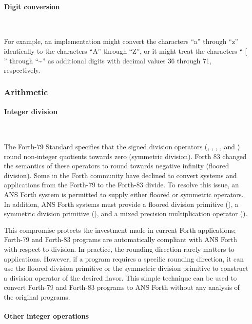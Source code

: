 \setcounter{paragraph}{1}
\paragraph{Digit conversion} ~ %

For example, an implementation might convert the characters ``a''
through ``z'' identically to the characters ``A'' through ``Z'', or
it might treat the characters `` [ '' through ``\~{}'' as additional
digits with decimal values 36 through 71, respectively.


\subsubsection{Arithmetic} %

\paragraph{Integer division} ~ %

The Forth-79 Standard specifies that the signed division operators
(\word{/}, , , , and \word{*/})
round non-integer quotients towards zero (symmetric division).
Forth 83 changed the semantics of these operators to round towards
negative infinity (floored division). Some in the Forth community
have declined to convert systems and applications from the Forth-79
to the Forth-83 divide. To resolve this issue, an ANS Forth system
is permitted to supply either floored or symmetric operators. In
addition, ANS Forth systems must provide a floored division primitive
(), a symmetric division primitive (), and
a mixed precision multiplication operator ().

This compromise protects the investment made in current Forth
applications; Forth-79 and Forth-83 programs are automatically
compliant with ANS Forth with respect to division. In practice, the
rounding direction rarely matters to applications. However, if a
program requires a specific rounding direction, it can use the
floored division primitive  or the symmetric division
primitive  to construct a division operator of the
desired flavor. This simple technique can be used to convert Forth-79
and Forth-83 programs to ANS Forth without any analysis of the
original programs.

\paragraph{Other integer operations} ~ %

